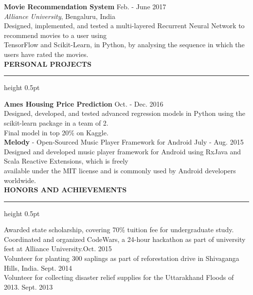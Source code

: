 \documentclass[a4paper]{article}
\newcommand{\myline}{\par
  \kern2pt %
  \hrule height 0.5pt
  \kern2pt %
}
\newcommand{\mybullet}{
	\indent \textbullet \hspace*{2mm}
}
\begin{document}
        \noindent
        \textbf{Movie Recommendation System} \hfill Feb. - June 2017\\
        \textit{Alliance University}, Bengaluru, India \\
        \mybullet Designed, implemented, and tested a multi-layered Recurrent Neural Network 
        to recommend movies to a user using \\ \hspace*{9mm} TensorFlow and Scikit-Learn, 
        in Python, by analysing the sequence in which the users have rated the movies. \\ 

	\noindent
	{\large \textbf{PERSONAL PROJECTS}}
	\myline 
	\smallskip
	
	\noindent
	\textbf{Ames Housing Price Prediction} \hfill Oct. - Dec. 2016 \\
	\mybullet Designed, developed, and tested advanced regression models in Python using 
        the scikit-learn package in a team of 2. \\
	\mybullet Final model in top 20\% on Kaggle. \\
	
	\noindent
	\textbf{Melody} - Open-Sourced Music Player Framework for Android \hfill July - Aug. 2015\\
	\mybullet Designed and developed music player framework for Android using RxJava and 
        Scala Reactive Extensions, which is freely\\ \hspace*{9mm} available under the MIT license 
        and is commonly used by Android developers worldwide. \\
	
	\noindent
	{\large \textbf{HONORS AND ACHIEVEMENTS}}
	\myline 
	\smallskip

        \mybullet Awarded state scholarship, covering 70\% tuition fee for undergraduate study. \\
        \mybullet Coordinated and organized CodeWars, a 24-hour hackathon as part of 
        university fest at Alliance University.\hfill Oct. 2015\\
        \mybullet Volunteer for planting 300 saplings as part of reforestation drive in 
        Shivaganga Hills, India. \hfill Sept. 2014 \\
        \mybullet Volunteer for collecting disaster relief supplies for the Uttarakhand Floods 
        of 2013. \hfill Sept. 2013 \\
		
	
\end{document}
